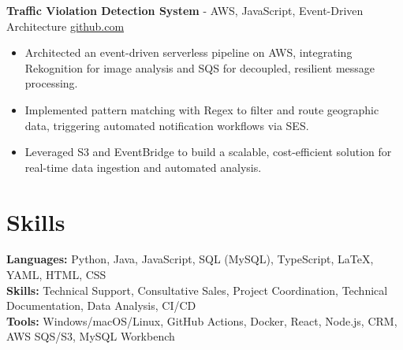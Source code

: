 \documentclass[11pt]{article}       %
\begin{document}
\textbf{Traffic Violation Detection System}{ - AWS, JavaScript, Event-Driven Architecture} \hfill \href{https://github.com/Monica20030707/AWS_rekonigition-N-read-database}{github.com} \\
\vspace{-9pt}
\begin{itemize}
  \item Architected an event-driven serverless pipeline on AWS, integrating Rekognition for image analysis and SQS for decoupled, resilient message processing.
  \item Implemented pattern matching with Regex to filter and route geographic data, triggering automated notification workflows via SES.
  \item Leveraged S3 and EventBridge to build a scalable, cost-efficient solution for real-time data ingestion and automated analysis.
\end{itemize}

\vspace{-18.5pt}


\section*{Skills}
\textbf{Languages:} Python, Java, JavaScript, SQL (MySQL), TypeScript, LaTeX, YAML, HTML, CSS\\
\textbf{Skills:} Technical Support, Consultative Sales, Project Coordination, Technical Documentation, Data Analysis, CI/CD\\
\textbf{Tools:} Windows/macOS/Linux, GitHub Actions, Docker, React, Node.js, CRM, AWS SQS/S3, MySQL Workbench\\

\vspace{-6.5pt}
\end{document}
